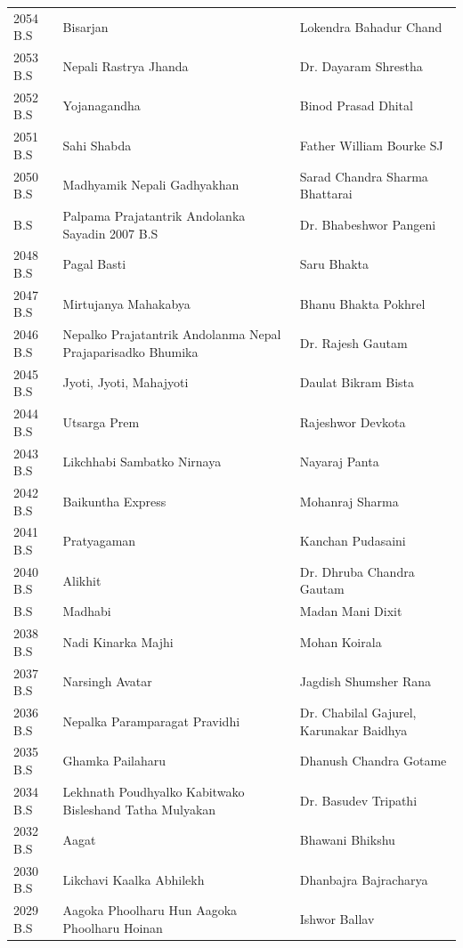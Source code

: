 \documentclass[
]{book}
\begin{document}
\begin{longtable}[t]{l>{\raggedright\arraybackslash}p{14em}>{\raggedright\arraybackslash}p{24em}}
\addlinespace
\rowcolor{gray!6}  2054 B.S & Bisarjan & Lokendra Bahadur Chand\\
2053 B.S & Nepali Rastrya Jhanda & Dr. Dayaram Shrestha\\
\rowcolor{gray!6}  2052 B.S & Yojanagandha & Binod Prasad Dhital\\
2051 B.S & Sahi Shabda & Father William Bourke SJ\\
\rowcolor{gray!6}  2050 B.S & Madhyamik Nepali Gadhyakhan & Sarad Chandra Sharma Bhattarai\\
\addlinespace
2049 B.S & Palpama Prajatantrik Andolanka Sayadin 2007 B.S & Dr. Bhabeshwor Pangeni\\
\rowcolor{gray!6}  2048 B.S & Pagal Basti & Saru Bhakta\\
2047 B.S & Mirtujanya Mahakabya & Bhanu Bhakta Pokhrel\\
\rowcolor{gray!6}  2046 B.S & Nepalko Prajatantrik Andolanma Nepal Prajaparisadko Bhumika & Dr. Rajesh Gautam\\
2045 B.S & Jyoti, Jyoti, Mahajyoti & Daulat Bikram Bista\\
\addlinespace
\rowcolor{gray!6}  2044 B.S & Utsarga Prem & Rajeshwor Devkota\\
2043 B.S & Likchhabi Sambatko Nirnaya & Nayaraj Panta\\
\rowcolor{gray!6}  2042 B.S & Baikuntha Express & Mohanraj Sharma\\
2041 B.S & Pratyagaman & Kanchan Pudasaini\\
\rowcolor{gray!6}  2040 B.S & Alikhit & Dr. Dhruba Chandra Gautam\\
\addlinespace
2039 B.S & Madhabi & Madan Mani Dixit\\
\rowcolor{gray!6}  2038 B.S & Nadi Kinarka Majhi & Mohan Koirala\\
2037 B.S & Narsingh Avatar & Jagdish Shumsher Rana\\
\rowcolor{gray!6}  2036 B.S & Nepalka Paramparagat Pravidhi & Dr. Chabilal Gajurel, Karunakar Baidhya\\
2035 B.S & Ghamka Pailaharu & Dhanush Chandra Gotame\\
\addlinespace
\rowcolor{gray!6}  2034 B.S & Lekhnath Poudhyalko Kabitwako Bisleshand Tatha Mulyakan & Dr. Basudev Tripathi\\
2032 B.S & Aagat & Bhawani Bhikshu\\
\rowcolor{gray!6}  2030 B.S & Likchavi Kaalka Abhilekh & Dhanbajra Bajracharya\\
2029 B.S & Aagoka Phoolharu Hun Aagoka Phoolharu Hoinan & Ishwor Ballav\\

\end{longtable}
\end{document}
